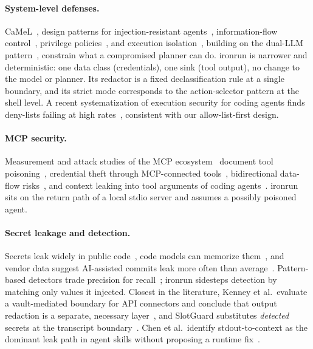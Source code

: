 \documentclass[10pt,twocolumn]{article}
\newcommand{\sys}{\textsf{ironrun}}
\begin{document}
\paragraph{System-level defenses.} CaMeL~\citep{debenedetti2025camel},
design patterns for injection-resistant agents~\citep{beurerkellner2025design},
information-flow control~\citep{costa2025fides,wu2024fsecure}, privilege
policies~\citep{shi2025progent}, and execution isolation~\citep{wu2025isolategpt},
building on the dual-LLM pattern~\citep{willison2023dual}, constrain what a
compromised planner can do. \sys{} is narrower and deterministic: one data class
(credentials), one sink (tool output), no change to the model or planner. Its
redactor is a fixed declassification rule at a single boundary, and its strict
mode corresponds to the action-selector pattern at the shell level. A recent
systematization of execution security for coding agents finds deny-lists failing
at high rates~\citep{rashidi2026balkanization}, consistent with our
allow-list-first design.

\paragraph{MCP security.} Measurement and attack studies of the MCP
ecosystem~\citep{hou2025mcplandscape,hasan2025mcpfirstglance,zhao2026parasites,guo2025mcpmeasurement,chen2026rethinkingmcp,zhou2026mcpauth}
document tool poisoning~\citep{invariant2025toolpoisoning,wang2026mcptox},
credential theft through MCP-connected tools~\citep{radosevich2025mcpsafety},
bidirectional data-flow risks~\citep{hou2026unsafeflow}, and context leaking into
tool arguments of coding agents~\citep{xie2025toolleak}. \sys{} sits on the
return path of a local stdio server and assumes a possibly poisoned agent.

\paragraph{Secret leakage and detection.} Secrets leak widely in public
code~\citep{meli2019git}, code models can memorize them~\citep{huang2024codesecret},
and vendor data suggest AI-assisted commits leak more often than
average~\citep{gitguardian2025sprawl,gitguardian2026sprawl}. Pattern-based
detectors trade precision for recall~\citep{basak2023comparative,basak2023secretbench};
\sys{} sidesteps detection by matching only values it injected. Closest in the
literature, Kenney et al.\ evaluate a vault-mediated boundary for API
connectors and conclude that output redaction is a separate, necessary
layer~\citep{kenney2026vault}, and SlotGuard substitutes \emph{detected}
secrets at the transcript boundary~\citep{xia2026slotguard}. Chen et al.\
identify stdout-to-context as the dominant leak path in agent skills without
proposing a runtime fix~\citep{chen2026skillsleak}.
\end{document}
